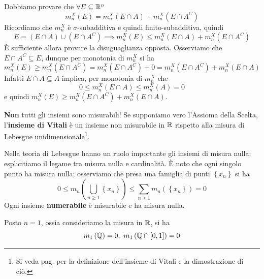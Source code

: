 \begin{demonstration}
	Dobbiamo provare che $\forall E\subseteq \mathbb{R}^n$
	\begin{equation*}
		m_n^X\left(E\right)=m_n^X\left(E\cap A\right)+m_n^X\left(E\cap A^C\right)
	\end{equation*}
	Ricordiamo che $m_n^X$ è $\sigma$-subadditiva e quindi finito-subadditiva, quindi
	\begin{equation*}
		E=\left(E\cap A\right)\cup \left(E\cap A^C\right)\implies m_n^X\left(E\right)\leq m_n^X\left(E\cap A\right)+m_n^X\left(E\cap A^C\right)
	\end{equation*}
	È sufficiente allora provare la disuguaglianza opposta. Osserviamo che $E\cap A^C\subseteq E$, dunque per monotonia di $m_n^X$ si ha
	\begin{equation*}
		m_n^X\left(E\right)\geq m_n^X\left(E\cap A^C\right)=m_n^X\left(E\cap A^C\right)+0=m_n^X\left(E\cap A^C\right)+m_n^X\left(E\cap A\right)
	\end{equation*}
	Infatti $E\cap A\subseteq A$ implica, per monotonia di $m_n^X$ che
	\begin{equation*}
		0\leq m_n^X\left(E\cap A\right)\leq m_n^X\left(A\right)=0
	\end{equation*}
	e quindi $m_n^X\left(E\right)\geq m_n^X\left(E\cap A^C\right)+m_n^X\left(E\cap A\right)$.
\end{demonstration}
\begin{attention}
	\textbf{Non} tutti gli insiemi sono misurabili! Se supponiamo vero l'Assioma della Scelta, l'\textbf{insieme di Vitali} è un insieme non misurabile in $\mathbb{R}$ rispetto alla misura di Lebesgue unidimensionale\footnote{Si veda pag. \pageref{vitali} per la definizione dell'insieme di Vitali e la dimostrazione di ciò.}.
\end{attention}
Nella teoria di Lebesgue hanno un ruolo importante gli insiemi di misura nulla: esplicitiamo il legame tra misura nulla e cardinalità.
È noto che ogni singolo punto ha misura nulla; osserviamo che presa una famiglia di punti $\left\{x_n\right\}$ si ha
\begin{equation*}
	0\leq m_n\left(\bigcup_{n\geq 1}\left\{x_n\right\}\right)\leq \sum_{n\geq 1}m_n\left(\left\{x_n\right\}\right)=0
\end{equation*}
Ogni insieme \textbf{numerabile} è misurabile e ha misura nulla.
\begin{example}
	Posto $n=1$, ossia consideriamo la misura in $\mathbb{R}$, si ha
	\begin{equation*}
		m_1\left(\rationalset\right)=0,\ m_1\left(\rationalset\cap\left[0,1\right]\right)=0
	\end{equation*}
\end{example}
